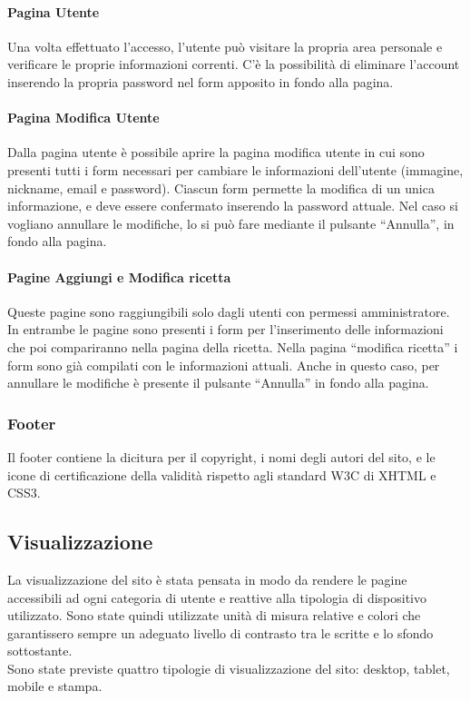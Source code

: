 \paragraph{Pagina Utente}
Una volta effettuato l'accesso, l'utente può visitare la propria area personale e verificare le proprie informazioni correnti. C'è la possibilità di eliminare l'account inserendo la propria password nel form apposito in fondo alla pagina.

\paragraph{Pagina Modifica Utente}
Dalla pagina utente è possibile aprire la pagina modifica utente in cui sono presenti tutti i form necessari per cambiare le informazioni dell'utente (immagine, nickname, email e password). Ciascun form permette la modifica di un unica informazione, e deve essere confermato inserendo la password attuale. Nel caso si vogliano annullare le modifiche, lo si può fare mediante il pulsante ``Annulla'', in fondo alla pagina.

\paragraph{Pagine Aggiungi e Modifica ricetta}
Queste pagine sono raggiungibili solo dagli utenti con permessi amministratore. In entrambe le pagine sono presenti i form per l'inserimento delle informazioni che poi compariranno nella pagina della ricetta. Nella pagina ``modifica ricetta'' i form sono già compilati con le informazioni attuali. Anche in questo caso, per annullare le modifiche è presente il pulsante ``Annulla'' in fondo alla pagina.

\subsubsection{Footer}
\label{ssub:footer}
Il footer contiene la dicitura per il copyright, i nomi degli autori del sito, e le icone di certificazione della validità rispetto agli standard W3C di XHTML e CSS3.

\subsection{Visualizzazione} %
\label{sub:visualizzazione}
La visualizzazione del sito è stata pensata in modo da rendere le pagine accessibili ad ogni categoria di utente e reattive alla tipologia di dispositivo utilizzato. Sono state quindi utilizzate unità di misura relative e colori che garantissero sempre un adeguato livello di contrasto tra le scritte e lo sfondo sottostante. \\
Sono state previste quattro tipologie di visualizzazione del sito: desktop, tablet, mobile e stampa.
